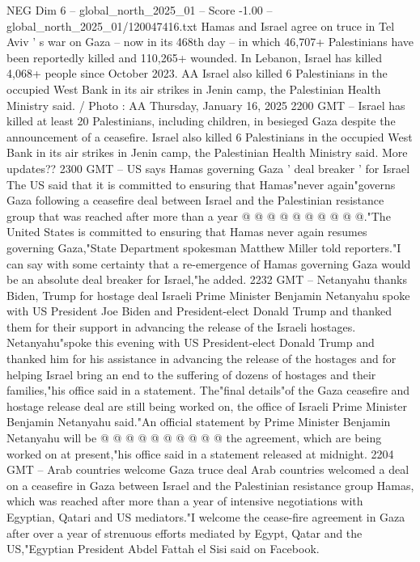 \begin{textsample}{NEG Dim 6 – global\_north\_2025\_01 – Score -1.00 – global\_north\_2025\_01/120047416.txt}  \label{ex:f6_neg_182}
Hamas and Israel agree on truce in Tel Aviv ' s war on Gaza -- now in its 468th day -- in which 46,707+ Palestinians have been reportedly killed and 110,265+ wounded.
In Lebanon, Israel has killed 4,068+ people since October 2023.
AA Israel also killed 6 Palestinians in the occupied West Bank in its air strikes in Jenin camp, the Palestinian Health Ministry said. / Photo : AA Thursday, January 16, 2025 2200 GMT -- Israel has killed at least 20 Palestinians, including children, in besieged Gaza despite the announcement of a ceasefire.
Israel also killed 6 Palestinians in the occupied West Bank in its air strikes in Jenin camp, the Palestinian Health Ministry said.
More updates?? 2300 GMT -- US says Hamas governing Gaza ' deal breaker ' for Israel The US said that it is committed to ensuring that Hamas"never again"governs Gaza following a ceasefire deal between Israel and the Palestinian resistance group that was reached after more than a year @ @ @ @ @ @ @ @ @ @."The United States is committed to ensuring that Hamas never again resumes governing Gaza,"State Department spokesman Matthew Miller told reporters."I can say with some certainty that a re-emergence of Hamas governing Gaza would be an absolute deal breaker for Israel,"he added. 2232 GMT -- Netanyahu thanks Biden, Trump for hostage deal Israeli Prime Minister Benjamin Netanyahu spoke with US President Joe Biden and President-elect Donald Trump and thanked them for their support in advancing the release of the Israeli hostages.
Netanyahu"spoke this evening with US President-elect Donald Trump and thanked him for his assistance in advancing the release of the hostages and for helping Israel bring an end to the suffering of dozens of hostages and their families,"his office said in a statement.
The"final details"of the Gaza ceasefire and hostage release deal are still being worked on, the office of Israeli Prime Minister Benjamin Netanyahu said."An official statement by Prime Minister Benjamin Netanyahu will be @ @ @ @ @ @ @ @ @ @ the agreement, which are being worked on at present,"his office said in a statement released at midnight. 2204 GMT -- Arab countries welcome Gaza truce deal Arab countries welcomed a deal on a ceasefire in Gaza between Israel and the Palestinian resistance group Hamas, which was reached after more than a year of intensive negotiations with Egyptian, Qatari and US mediators."I welcome the cease-fire agreement in Gaza after over a year of strenuous efforts mediated by Egypt, Qatar and the US,"Egyptian President Abdel Fattah el Sisi said on Facebook.

\end{textsample}
